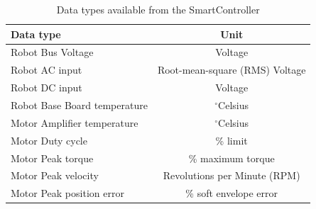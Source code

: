 \begin{table}[ht]
\centering
\caption[Data types available from the SmartController]{Data types available from the SmartController}
\label{Data types}
\begin{tabular}{l | c}
Data type & Unit \\
\hline
Robot Bus Voltage & Voltage \\
Robot AC input & Root-mean-square (RMS) Voltage \\
Robot DC input & Voltage \\
Robot Base Board temperature & $^\circ$Celsius \\
Motor Amplifier temperature & $^\circ$Celsius \\
Motor Duty cycle & \% limit \\
Motor Peak torque & \% maximum torque \\
Motor Peak velocity & Revolutions per Minute (RPM) \\
Motor Peak position error & \% soft envelope error 
\end{tabular}
\end{table}

